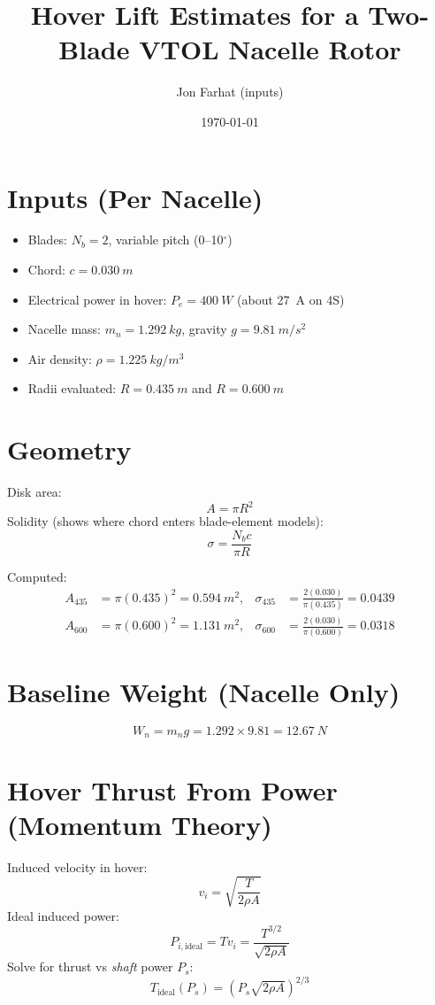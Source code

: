\documentclass[11pt]{article}
\title{Hover Lift Estimates for a Two-Blade VTOL Nacelle Rotor}
\author{Jon Farhat (inputs)}
\date{\today}
\begin{document}
\maketitle

\section{Inputs (Per Nacelle)}
\begin{itemize}
  \item Blades: $N_b=2$, variable pitch (0--10$^\circ$)
  \item Chord: $c=\SI{0.030}{m}$
  \item Electrical power in hover: $P_e=\SI{400}{W}$ (about \SI{27}{A} on 4S)
  \item Nacelle mass: $m_n=\SI{1.292}{kg}$, gravity $g=\SI{9.81}{m/s^2}$
  \item Air density: $\rho=\SI{1.225}{kg/m^3}$
  \item Radii evaluated: $R=\SI{0.435}{m}$ and $R=\SI{0.600}{m}$
\end{itemize}

\section{Geometry}
Disk area:
\begin{equation}
A=\pi R^2
\end{equation}
Solidity (shows where chord enters blade-element models):
\begin{equation}
\sigma=\frac{N_b c}{\pi R}
\end{equation}

Computed:
\begin{align}
A_{435} &= \pi(0.435)^2 = \SI{0.594}{m^2}, &
\sigma_{435} &= \frac{2(0.030)}{\pi(0.435)} = 0.0439 \\
A_{600} &= \pi(0.600)^2 = \SI{1.131}{m^2}, &
\sigma_{600} &= \frac{2(0.030)}{\pi(0.600)} = 0.0318
\end{align}

\section{Baseline Weight (Nacelle Only)}
\begin{equation}
W_n=m_n g = 1.292\times 9.81 = \SI{12.67}{N}
\end{equation}

\section{Hover Thrust From Power (Momentum Theory)}
Induced velocity in hover:
\begin{equation}
v_i=\sqrt{\frac{T}{2\rho A}}
\end{equation}
Ideal induced power:
\begin{equation}
P_{i,\mathrm{ideal}} = T v_i = \frac{T^{3/2}}{\sqrt{2\rho A}}
\end{equation}
Solve for thrust vs \emph{shaft} power $P_s$:
\begin{equation}
T_{\mathrm{ideal}}(P_s)=\left(P_s\sqrt{2\rho A}\right)^{2/3}
\end{equation}
\end{document}
